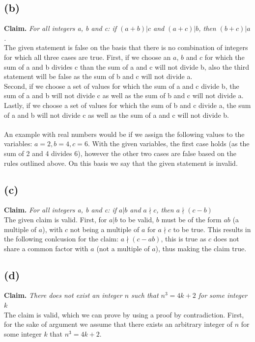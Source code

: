 \documentclass[a4paper]{article}
\begin{document}
\subsection{(b)} 
\textbf{Claim.} \textit{For all integers a, b and c: if $(a + b) | c$ and $(a + c)|b$, then $(b + c) | a $.}\\
The given statement is false on the basis that there is no combination of integers for which all three cases are true.
First, if we choose an $a$, $b$ and $c$ for which the sum of a and b divides c than the sum of a and c will not divide b, also the third statement will be false as the sum of b and c will not divide a.\\
Second, if we choose a set of values for which the sum of a and c divide b, the sum of a and b will not divide c as well as the sum of b and c will not divide a.\\
Lastly, if we choose a set of values for which the sum of b and c divide a, the sum of a and b will not divide c as well as the sum of a and c will not divide b.\\
\\
An example with real numbers would be if we assign the following values to the variables: $a = 2, b = 4, c = 6$.
With the given variables, the first case holds (as the sum of 2 and 4 divides 6), however the other two cases are false based on the rules outlined above.
On this basis we say that the given statement is invalid.
\subsection{(c)} 
\textbf{Claim.} \textit{For all integers a, b and c: if $a|b$ and $a \nmid c$, then $a \nmid (c-b)$} \\
The given claim is valid.
First, for $a | b$ to be valid, $b$ must be of the form $ab$ (a multiple of $a$), with $c$ not being a multiple of $a$ for $a \nmid c$ to be true.
This results in the following conlcusion for the claim: $a \nmid (c - ab)$, this is true as $c$ does not share a common factor with $a$ (not a multiple of $a$), thus making the claim true.

\subsection{(d)} 
\textbf{Claim.} \textit{There does not exist an integer $n$ such that $n^3 = 4k + 2$ for some integer $k$} \\
The claim is valid, which we can prove by using a proof by contradiction.
First, for the sake of argument we assume that there exists an arbitrary integer of $n$ for some integer $k$ that $n^3 = 4k + 2$.
\end{document}

